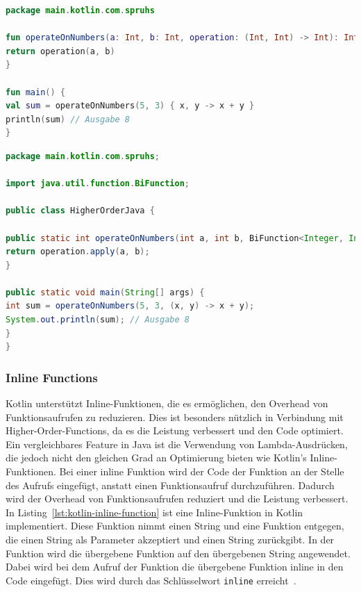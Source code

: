 \documentclass[11pt]{article}
\begin{document}
    \begin{lstlisting}[language=Kotlin, caption={HigherOrderKotlin.kt}, label={lst:kotlin-higher-order-function}]
package main.kotlin.com.spruhs

fun operateOnNumbers(a: Int, b: Int, operation: (Int, Int) -> Int): Int {
return operation(a, b)
}

fun main() {
val sum = operateOnNumbers(5, 3) { x, y -> x + y }
println(sum) // Ausgabe 8
}
    \end{lstlisting}

    \begin{lstlisting}[language=Java, caption={HigherOrderJava.java}, label={lst:java-higher-order-function}]
package main.kotlin.com.spruhs;

import java.util.function.BiFunction;

public class HigherOrderJava {

public static int operateOnNumbers(int a, int b, BiFunction<Integer, Integer, Integer> operation) {
return operation.apply(a, b);
}

public static void main(String[] args) {
int sum = operateOnNumbers(5, 3, (x, y) -> x + y);
System.out.println(sum); // Ausgabe 8
}
}
    \end{lstlisting}

    \subsubsection{Inline Functions}
    Kotlin unterstützt Inline-Funktionen, die es ermöglichen, den Overhead von Funktionsaufrufen zu reduzieren.
    Dies ist besonders nützlich in Verbindung mit Higher-Order-Functions, da es die Leistung verbessert und den Code optimiert.
    Ein vergleichbares Feature in Java ist die Verwendung von Lambda-Ausdrücken, die jedoch nicht den gleichen Grad an Optimierung bieten wie Kotlin's Inline-Funktionen.
    Bei einer inline Funktion wird der Code der Funktion an der Stelle des Aufrufs eingefügt, anstatt einen Funktionsaufruf durchzuführen.
    Dadurch wird der Overhead von Funktionsaufrufen reduziert und die Leistung verbessert.
    In Listing~\ref{lst:kotlin-inline-function} ist eine Inline-Funktion in Kotlin implementiert.
    Diese Funktion nimmt einen String und eine Funktion entgegen, die einen String als Parameter akzeptiert und einen String zurückgibt.
    In der Funktion wird die übergebene Funktion auf den übergebenen String angewendet.
    Dabei wird bei dem Aufruf der Funktion die übergebene Funktion inline in den Code eingefügt.
    Dies wird durch das Schlüsselwort \texttt{inline} erreicht~\cite{kotlin-inline}.
\end{document}
